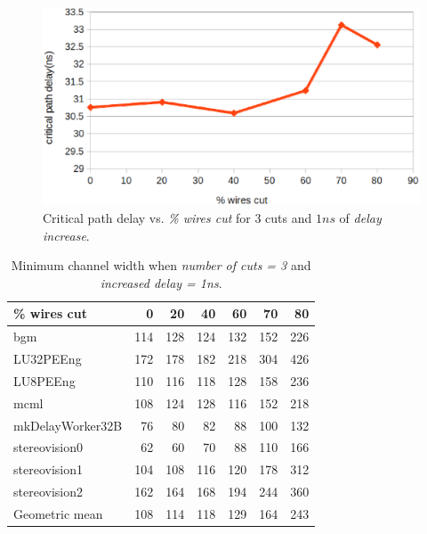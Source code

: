 \documentclass{sig-alternate-2013}
\begin{document}
\begin{figure}[!htbp]
\centering
\includegraphics[width=\linewidth]{standard_crit_path.eps}
\caption{Critical path delay vs. \textit{\% wires cut} for 3 cuts and $1ns$ of \textit{delay increase}.}
\label{fig:standard_crit}
\end{figure}

\begin{table}[!htbp]
\begin{tabular}{|l|r|r|r|r|r|r|}
\hline
\% wires cut & 0 & 20 & 40 & 60 & 70 & 80 \\ \hline \hline
bgm & 114 & 128 & 124 & 132 & 152 & 226 \\ \hline
LU32PEEng & 172 & 178 & 182 & 218 & 304 & 426 \\ \hline
LU8PEEng & 110 & 116 & 118 & 128 & 158 & 236 \\ \hline
mcml & 108 & 124 & 128 & 116 & 152 & 218 \\ \hline
mkDelayWorker32B & 76 & 80 & 82 & 88 & 100 & 132 \\ \hline
stereovision0 & 62 & 60 & 70 & 88 & 110 & 166 \\ \hline
stereovision1 & 104 & 108 & 116 & 120 & 178 & 312 \\ \hline
stereovision2 & 162 & 164 & 168 & 194 & 244 & 360 \\ \hline
Geometric mean & 108 & 114 & 118 & 129 & 164 & 243 \\ \hline
\end{tabular}
\caption{Minimum channel width when \textit{number of cuts = 3} and \textit{increased delay = 1ns}.}
\label{table:standard_minW}
\end{table}
\end{document}

